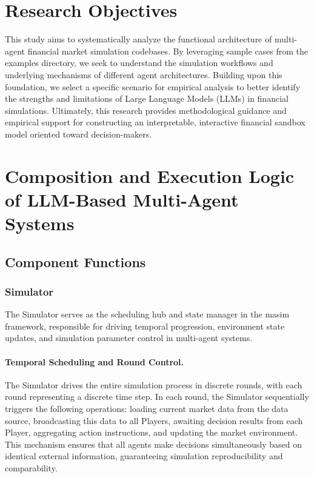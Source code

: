 \documentclass{article}
\begin{document}
\section{Research Objectives}
\label{sec:objectives}

This study aims to systematically analyze the functional architecture of multi-agent financial market simulation codebases. By leveraging sample cases from the examples directory, we seek to understand the simulation workflows and underlying mechanisms of different agent architectures. Building upon this foundation, we select a specific scenario for empirical analysis to better identify the strengths and limitations of Large Language Models (LLMs) \cite{qwen2.5-analysis} in financial simulations. Ultimately, this research provides methodological guidance and empirical support for constructing an interpretable, interactive financial sandbox model oriented toward decision-makers.


\section{Composition and Execution Logic of LLM-Based Multi-Agent Systems}
\label{sec:system}

\subsection{Component Functions}
\label{subsec:components}

\subsubsection{Simulator}
\label{subsubsec:simulator}

The Simulator serves as the scheduling hub and state manager in the masim framework, responsible for driving temporal progression, environment state updates, and simulation parameter control in multi-agent systems.

\paragraph{Temporal Scheduling and Round Control.}
The Simulator drives the entire simulation process in discrete rounds, with each round representing a discrete time step. In each round, the Simulator sequentially triggers the following operations: loading current market data from the data source, broadcasting this data to all Players, awaiting decision results from each Player, aggregating action instructions, and updating the market environment. This mechanism ensures that all agents make decisions simultaneously based on identical external information, guaranteeing simulation reproducibility and comparability.
\end{document}

